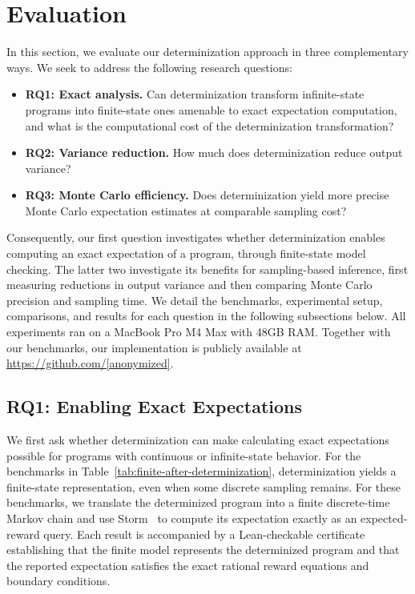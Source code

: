 \section{Evaluation}
\label{sec:evaluation}

In this section, we evaluate our determinization approach in three complementary ways. We seek to address the following research questions:

\begin{itemize}
    \item \textbf{RQ1: Exact analysis.} Can determinization transform infinite-state programs into finite-state ones amenable to exact expectation computation, and what is the computational cost of the determinization transformation?
    
    \item \textbf{RQ2: Variance reduction.} How much does determinization reduce output variance?
    
    \item \textbf{RQ3: Monte Carlo efficiency.} Does determinization yield more precise Monte Carlo expectation estimates at comparable sampling cost?
\end{itemize}

Consequently, our first question investigates whether determinization enables computing an exact expectation of a program, through finite-state model checking. The latter two investigate its benefits for sampling-based inference, first measuring reductions in output variance and then comparing Monte Carlo precision and sampling time. We detail the benchmarks, experimental setup, comparisons, and results for each question in the following subsections below. All experiments ran on a MacBook Pro M4 Max with 48GB RAM. Together with our benchmarks, our implementation is publicly available at \href{https://github.com/[anonymized]}{https://github.com/[anonymized]}.

\subsection{RQ1: Enabling Exact Expectations}

We first ask whether determinization can make calculating exact expectations possible for programs with continuous or infinite-state behavior. For the benchmarks in Table~\ref{tab:finite-after-determinization}, determinization yields a finite-state representation, even when some discrete sampling remains. For these benchmarks, we translate the determinized program into a finite discrete-time Markov chain and use Storm~\cite{hensel2022storm} to compute its expectation exactly as an expected-reward query. Each result is accompanied by a Lean-checkable certificate establishing that the finite model represents the determinized program and that the reported expectation satisfies the exact rational reward equations and boundary conditions.

